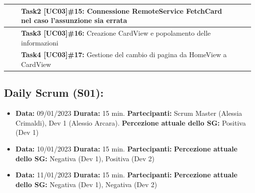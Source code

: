 \begin{landscape}
\begin{itemize}
\begin{tabular}{ | p{6cm} | p{3.2cm} | p{7.8cm} | p{3cm} | p{2.8cm}| }
                \hline
                & & \textbf{Task2 [UC03]\#15:} Connessione RemoteService FetchCard nel caso l'assunzione sia errata & & \\
                \hline
                & & \textbf{Task3 [UC03]\#16:} Creazione CardView e popolamento delle informazioni & & \\
                \hline
                & & \textbf{Task4 [UC03]\#17:} Gestione del cambio di pagina da HomeView a CardView & & \\
                \hline
            \end{tabular}
        \end{itemize}
        \normalsize

        \newpage
        \subsection{Daily Scrum (S01):}
        \begin{itemize}
            \item \textbf{Data:} 09/01/2023
            \newline \textbf{Durata:} 15 min.
            \newline \textbf{Partecipanti:} Scrum Master (Alessia Crimaldi), Dev 1 (Alessio Arcara).
            \newline \textbf{Percezione attuale dello SG:} Positiva (Dev 1)
        \end{itemize}
        \begin{itemize}
            \item \textbf{Data:} 10/01/2023
            \newline \textbf{Durata:} 15 min.
            \newline \textbf{Partecipanti:} \uno
            \newline \textbf{Percezione attuale dello SG:} Negativa (Dev 1), Positiva (Dev 2)
        \end{itemize}
        \begin{itemize}
            \item \textbf{Data:} 11/01/2023
            \newline \textbf{Durata:} 15 min.
            \newline \textbf{Partecipanti:} \uno
            \newline \textbf{Percezione attuale dello SG:} Negativa (Dev 1), Negativa (Dev 2)
        \end{itemize}
        \begin{itemize}

\end{itemize}
\end{landscape}

